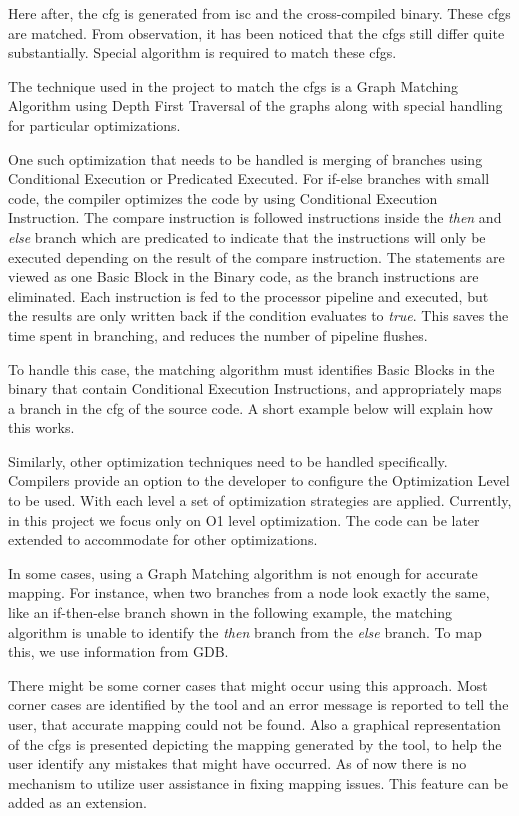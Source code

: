 Here after, the \gls{cfg} is generated from \gls{isc} and the cross-compiled binary. These \gls{cfg}s are matched. From observation, it has been noticed that the \gls{cfg}s still differ quite substantially. Special algorithm is required to match these \gls{cfg}s. 

The technique used in the project to match the \gls{cfg}s is a Graph Matching Algorithm using Depth First Traversal of the graphs along with special handling for particular optimizations. 

One such optimization that needs to be handled is merging of branches using Conditional Execution or Predicated Executed. For if-else branches with small code, the compiler optimizes the code by using Conditional Execution Instruction. The compare instruction is followed instructions inside the \textit{then} and \textit{else} branch which are predicated to indicate that the instructions will only be executed depending on the result of the compare instruction. The statements are viewed as one Basic Block in the Binary code, as the branch instructions are eliminated. Each instruction is fed to the processor pipeline and executed, but the results are only written back if the condition evaluates to \textit{true}. This saves the time spent in branching, and reduces the number of pipeline flushes.

To handle this case, the matching algorithm must identifies Basic Blocks in the binary that contain Conditional Execution Instructions, and appropriately maps a branch in the \gls{cfg} of the source code. A short example below will explain how this works.


Similarly, other optimization techniques need to be handled specifically. Compilers provide an option to the developer to configure the Optimization Level to be used. With each level a set of optimization strategies are applied. Currently, in this project we focus only on O1 level optimization. The code can be later extended to accommodate for other optimizations.

In some cases, using a Graph Matching algorithm is not enough for accurate mapping. For instance, when two branches from a node look exactly the same, like an if-then-else branch shown in the following example, the matching algorithm is unable to identify the \textit{then} branch from the \textit{else} branch. To map this, we use information from GDB.

There might be some corner cases that might occur using this approach. Most corner cases are identified by the tool and an error message is reported to tell the user, that accurate mapping could not be found. Also a graphical representation of the \gls{cfg}s is presented depicting the mapping generated by the tool, to help the user identify any mistakes that might have occurred. As of now there is no mechanism to utilize user assistance in fixing mapping issues. This feature can be added as an extension.


